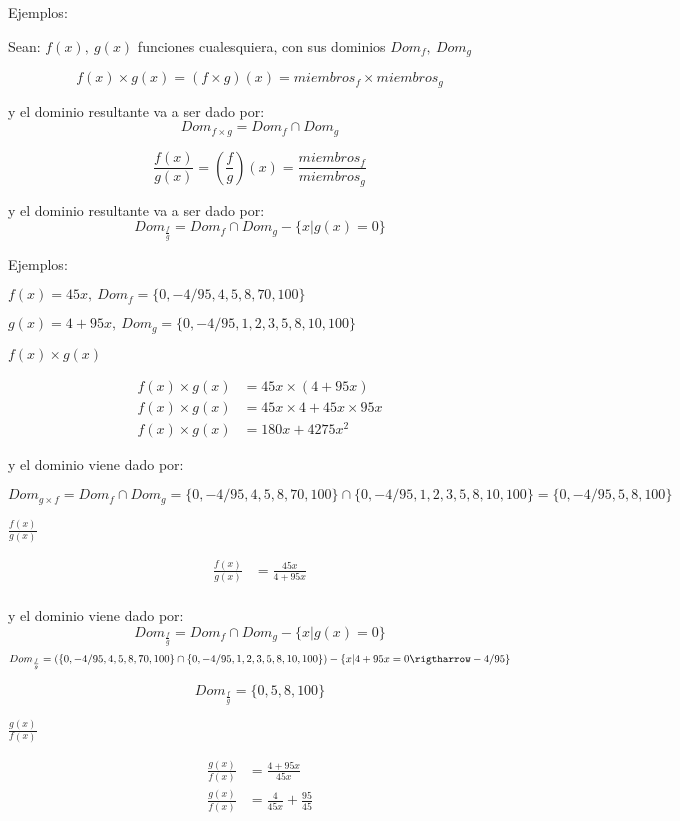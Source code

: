 Ejemplos:

Sean: $ f(x),\ g(x) $ funciones cualesquiera, con sus dominios $ Dom_f,\ Dom_g $

    $$ f(x) \times g(x)=(f \times g)(x)= miembros_f \times miembros_g $$

y el dominio resultante va a ser dado por:
    $$ Dom_{f\times g}= Dom_f \cap Dom_g $$

    $$ \frac{f(x)}{g(x)}=( \frac{f}{g})(x)= \frac{miembros_f}{miembros_g} $$

y el dominio resultante va a ser dado por:
    $$ Dom_{\frac{f}{g}}= Dom_f \cap Dom_g -\{x|g(x)=0\}$$

    Ejemplos:

    $ f(x)= 45x,\ Dom_f=\{0,-4/95,4,5,8,70,100\} $

    $ g(x)=4 +95x,\ Dom_g= \{0,-4/95, 1,2,3,5,8,10,100\}$


    $ f(x)\times g(x) $

    \begin{align*}
        f(x)\times g(x) &= 45x\times(4+95x)		\\
        f(x)\times g(x) &= 45x\times4 + 45x\times95x\\
        f(x)\times g(x) &= 180x+4275x^2
    \end{align*}

    y el dominio viene dado por:

    $$ Dom_{g\times f} = Dom_f \cap Dom_g =\{0,-4/95,4,5,8,70,100\} \cap \{0,-4/95,1,2,3,5,8,10,100\}=\{0,-4/95,5,8,100\} $$

    $ \frac{f(x)}{g(x)}  $

    \begin{align*}
        \frac{f(x)}{g(x)} &= \frac{45x}{4+95x} 		\\
    \end{align*}

    y el dominio viene dado por:
    $$ Dom_{\frac{f}{g}}= Dom_f \cap Dom_g -\{x|g(x)=0\}$$
    $$ Dom_{\frac{f}{g} } =  (\{0,-4/95,4,5,8,70,100\} \cap \{0,-4/95,1,2,3,5,8,10,100\}) -\{x|4+95x=0\rigtharrow -4/95 \}$$

    $$Dom_{\frac{f}{g} }=\{0,5,8,100\} $$

$ \frac{g(x)}{f(x)}  $

    \begin{align*}
        \frac{g(x)}{f(x)} &= \frac{4+95x}{45x}		\\
        \frac{g(x)}{f(x)} &= \frac{4}{45x} +\frac{95}{45}
    \end{align*}

